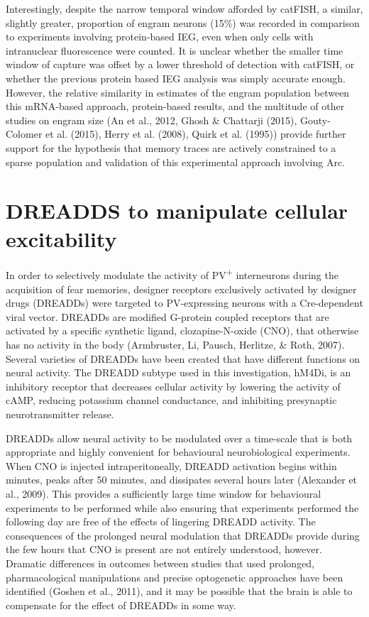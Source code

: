 \documentclass[12pt,a4paperpaper,]{report}
\begin{document}
Interestingly, despite the narrow temporal window afforded by catFISH, a
similar, slightly greater, proportion of engram neurons (15\%) was
recorded in comparison to experiments involving protein-based IEG, even
when only cells with intranuclear fluorescence were counted. It is
unclear whether the smaller time window of capture was offset by a lower
threshold of detection with catFISH, or whether the previous protein
based IEG analysis was simply accurate enough. However, the relative
similarity in estimates of the engram population between this mRNA-based
approach, protein-based results, and the multitude of other studies on
engram size (An et al., 2012, Ghosh \& Chattarji (2015), Gouty-Colomer
et al. (2015), Herry et al. (2008), Quirk et al. (1995)) provide further
support for the hypothesis that memory traces are actively constrained
to a sparse population and validation of this experimental approach
involving Arc.

\section{DREADDS to manipulate cellular
excitability}\label{dreadds-to-manipulate-cellular-excitability}

In order to selectively modulate the activity of PV\textsuperscript{+}
interneurons during the acquisition of fear memories, designer receptors
exclusively activated by designer drugs (DREADDs) were targeted to
PV-expressing neurons with a Cre-dependent viral vector. DREADDs are
modified G-protein coupled receptors that are activated by a specific
synthetic ligand, clozapine-N-oxide (CNO), that otherwise has no
activity in the body (Armbruster, Li, Pausch, Herlitze, \& Roth, 2007).
Several varieties of DREADDs have been created that have different
functions on neural activity. The DREADD subtype used in this
investigation, hM4Di, is an inhibitory receptor that decreases cellular
activity by lowering the activity of cAMP, reducing potassium channel
conductance, and inhibiting presynaptic neurotransmitter release.

DREADDs allow neural activity to be modulated over a time-scale that is
both appropriate and highly convenient for behavioural neurobiological
experiments. When CNO is injected intraperitoneally, DREADD activation
begins within minutes, peaks after 50 minutes, and dissipates several
hours later (Alexander et al., 2009). This provides a sufficiently large
time window for behavioural experiments to be performed while also
ensuring that experiments performed the following day are free of the
effects of lingering DREADD activity. The consequences of the prolonged
neural modulation that DREADDs provide during the few hours that CNO is
present are not entirely understood, however. Dramatic differences in
outcomes between studies that used prolonged, pharmacological
manipulations and precise optogenetic approaches have been identified
(Goshen et al., 2011), and it may be possible that the brain is able to
compensate for the effect of DREADDs in some way.
\end{document}
